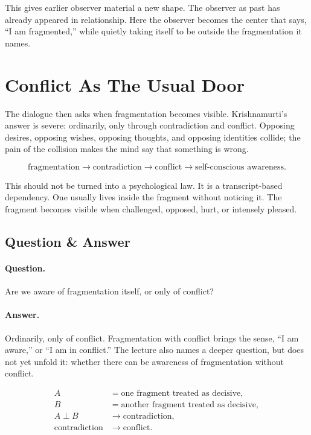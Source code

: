 \documentclass[11pt,oneside]{book}
\begin{document}
This gives earlier observer material a new shape. The observer as past has already appeared in relationship. Here the observer becomes the center that says, ``I am fragmented,'' while quietly taking itself to be outside the fragmentation it names.

\section{Conflict As The Usual Door}

The dialogue then asks when fragmentation becomes visible. Krishnamurti's answer is severe: ordinarily, only through contradiction and conflict. Opposing desires, opposing wishes, opposing thoughts, and opposing identities collide; the pain of the collision makes the mind say that something is wrong.

\begin{equation}
\text{fragmentation}
\longrightarrow
\text{contradiction}
\longrightarrow
\text{conflict}
\longrightarrow
\text{self-conscious awareness}.
\end{equation}

This should not be turned into a psychological law. It is a transcript-based dependency. One usually lives inside the fragment without noticing it. The fragment becomes visible when challenged, opposed, hurt, or intensely pleased.

\subsection{Question \& Answer}

\paragraph{Question.}
Are we aware of fragmentation itself, or only of conflict?

\paragraph{Answer.}
Ordinarily, only of conflict. Fragmentation with conflict brings the sense, ``I am aware,'' or ``I am in conflict.'' The lecture also names a deeper question, but does not yet unfold it: whether there can be awareness of fragmentation without conflict.

\begin{align}
A &= \text{one fragment treated as decisive},\\
B &= \text{another fragment treated as decisive},\\
A\perp B &\longrightarrow \text{contradiction},\\
\text{contradiction} &\longrightarrow \text{conflict}.
\end{align}
\end{document}
